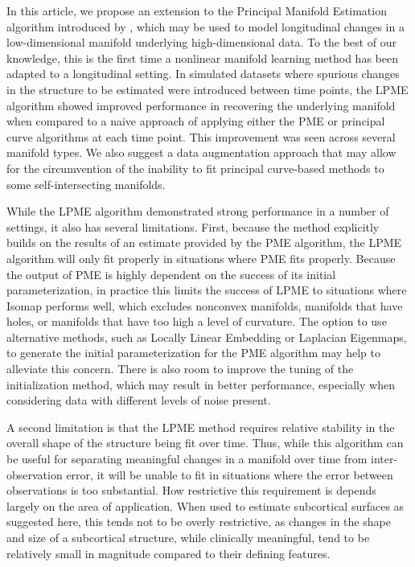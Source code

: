 \documentclass[11pt,reqno]{article}
\theoremstyle{definition}
\begin{document}
In this article, we propose an extension to the Principal Manifold Estimation algorithm introduced by \cite{mengPrincipalManifoldEstimation2021}, which may be used to model longitudinal changes in a low-dimensional manifold underlying high-dimensional data. To the best of our knowledge, this is the first time a nonlinear manifold learning method has been adapted to a longitudinal setting. In simulated datasets where spurious changes in the structure to be estimated were introduced between time points, the LPME algorithm showed improved performance in recovering the underlying manifold when compared to a naive approach of applying either the PME or principal curve algorithms at each time point. This improvement was seen across several manifold types. We also suggest a data augmentation approach that may allow for the circumvention of the inability to fit principal curve-based methods to some self-intersecting manifolds. 

While the LPME algorithm demonstrated strong performance in a number of settings, it also has several limitations. First, because the method explicitly builds on the results of an estimate provided by the PME algorithm, the LPME algorithm will only fit properly in situations where PME fits properly. Because the output of PME is highly dependent on the success of its initial parameterization, in practice this limits the success of LPME to situations where Isomap performs well, which excludes nonconvex manifolds, manifolds that have holes, or manifolds that have too high a level of curvature. The option to use alternative methods, such as Locally Linear Embedding or Laplacian Eigenmaps, to generate the initial parameterization for the PME algorithm may help to alleviate this concern. There is also room to improve the tuning of the initialization method, which may result in better performance, especially when considering data with different levels of noise present.

A second limitation is that the LPME method requires relative stability in the overall shape of the structure being fit over time. Thus, while this algorithm can be useful for separating meaningful changes in a manifold over time from inter-observation error, it will be unable to fit in situations where the error between observations is too substantial. How restrictive this requirement is depends largely on the area of application. When used to estimate subcortical surfaces as suggested here, this tends not to be overly restrictive, as changes in the shape and size of a subcortical structure, while clinically meaningful, tend to be relatively small in magnitude compared to their defining features.
\end{document}
